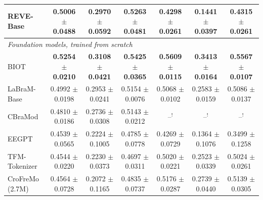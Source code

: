 \begin{table}[t]
{\begin{tabular}{lcccccc}
REVE-Base & 0.5006 $\pm$ 0.0488 & 0.2970 $\pm$ 0.0592 & 0.5263 $\pm$ 0.0481 & 0.4298 $\pm$ 0.0261 & 0.1441 $\pm$ 0.0397 & 0.4315 $\pm$ 0.0261 \\
\midrule
\multicolumn{7}{l}{\textit{Foundation models, trained from scratch}} \\
BIOT & \textbf{0.5254 $\pm$ 0.0210} & \textbf{0.3108 $\pm$ 0.0421} & \textbf{0.5425 $\pm$ 0.0365} & \textbf{0.5609 $\pm$ 0.0115} & \textbf{0.3413 $\pm$ 0.0164} & \textbf{0.5567 $\pm$ 0.0107} \\
LaBraM-Base & 0.4992 $\pm$ 0.0198 & 0.2953 $\pm$ 0.0241 & 0.5154 $\pm$ 0.0076 & 0.5068 $\pm$ 0.0102 & 0.2583 $\pm$ 0.0159 & 0.5086 $\pm$ 0.0137 \\
CBraMod & 0.4810 $\pm$ 0.0186 & 0.2736 $\pm$ 0.0308 & 0.5143 $\pm$ 0.0212 & --$^{!}$ & --$^{!}$ & --$^{!}$ \\
EEGPT & 0.4539 $\pm$ 0.0565 & 0.2224 $\pm$ 0.1005 & 0.4785 $\pm$ 0.0778 & 0.4269 $\pm$ 0.0729 & 0.1364 $\pm$ 0.1076 & 0.3499 $\pm$ 0.1258 \\
TFM-Tokenizer & 0.4544 $\pm$ 0.0220 & 0.2230 $\pm$ 0.0373 & 0.4697 $\pm$ 0.0311 & 0.5020 $\pm$ 0.0221 & 0.2523 $\pm$ 0.0339 & 0.5024 $\pm$ 0.0261 \\
\midrule
CroFreMo (2.7M) & 0.4564 $\pm$ 0.0728 & 0.2072 $\pm$ 0.1165 & 0.4835 $\pm$ 0.0737 & 0.5176 $\pm$ 0.0287 & 0.2739 $\pm$ 0.0440 & 0.5139 $\pm$ 0.0305 \\
\bottomrule
\end{tabular}}
\end{table}

